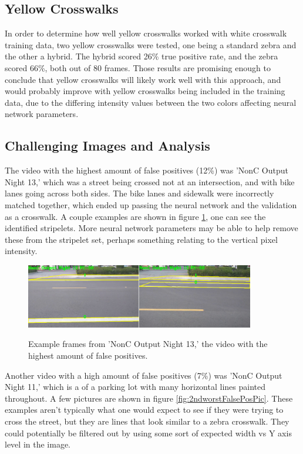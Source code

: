 \documentclass[12pt]{ucthesis}
\newcommand{\captionfonts}{\small\bf\ssp}
\begin{document}
\subsection{Yellow Crosswalks}

In order to determine how well yellow crosswalks worked with white crosswalk training data, two yellow crosswalks were tested, one being a standard zebra and the other a hybrid. The hybrid scored 26\% true positive rate, and the zebra scored 66\%, both out of 80 frames. Those results are promising enough to conclude that yellow crosswalks will likely work well with this approach, and would probably improve with yellow crosswalks being included in the training data, due to the differing intensity values between the two colors affecting neural network parameters. 

\subsection{Challenging Images and Analysis}

The video with the highest amount of false positives (12\%) was 'NonC Output Night 13,' which was a street being crossed not at an intersection, and with bike lanes going across both sides. The bike lanes and sidewalk were incorrectly matched together, which ended up passing the neural network and the validation as a crosswalk. A couple examples are shown in figure \ref{fig:worstFalsePosPic}, one can see the identified stripelets. More neural network parameters may be able to help remove these from the stripelet set, perhaps something relating to the vertical pixel intensity. 

\begin{figure}[t]
\begin{center}
\includegraphics[width=10cm]{NonCWorstCwalk.png}
\captionfonts
\caption[Worst False Positive Examples]{Example frames from 'NonC Output Night 13,' the video with the highest amount of false positives.}
\label{fig:worstFalsePosPic}
\end{center}
\end{figure}

Another video with a high amount of false positives (7\%) was 'NonC Output Night 11,' which is a of a parking lot with many horizontal lines painted throughout.  A few pictures are shown in figure \ref{fig:2ndworstFalsePosPic}. These examples aren't typically what one would expect to see if they were trying to cross the street, but they are lines that look similar to a zebra crosswalk. They could potentially be filtered out by using some sort of expected width vs Y axis level in the image. 
\end{document}
